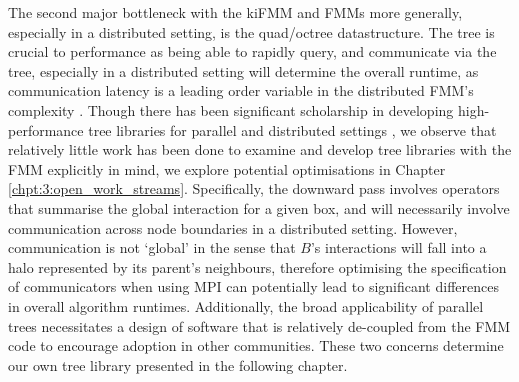 The second major bottleneck with the kiFMM and FMMs more generally, especially in a distributed setting, is the quad/octree datastructure. The tree is crucial to performance as being able to rapidly query, and communicate via the tree, especially in a distributed setting will determine the overall runtime, as communication latency is a leading order variable in the distributed FMM's complexity \cite{Yokota2014}. Though there has been significant scholarship in developing high-performance tree libraries for parallel and distributed settings \cite{BursteddeWilcoxGhattas11,sundar2008bottom,sundar2013hyksort}, we observe that relatively little work has been done to examine and develop tree libraries with the FMM explicitly in mind, we explore potential optimisations in Chapter \ref{chpt:3:open_work_streams}. Specifically, the downward pass involves operators that summarise the global interaction for a given box, and will necessarily involve communication across node boundaries in a distributed setting. However, communication is not `global' in the sense that $B$'s interactions will fall into a halo represented by its parent's neighbours, therefore optimising the specification of communicators when using MPI can potentially lead to significant differences in overall algorithm runtimes. Additionally, the broad applicability of parallel trees necessitates a design of software that is relatively de-coupled from the FMM code to encourage adoption in other communities. These two concerns determine our own tree library presented in the following chapter.

